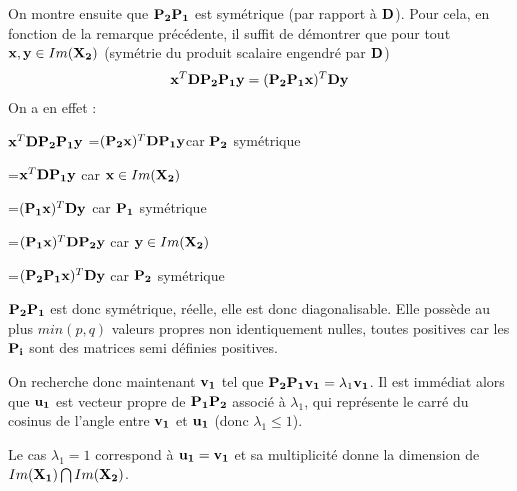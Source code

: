 \documentclass[letterpaper,10pt,french]{sphinxmanual}
\begin{document}
\sphinxAtStartPar
On montre ensuite que \({\bf P_2}{\bf P_1}\) est symétrique (par rapport à \({\bf D}\)). Pour cela, en fonction de la remarque précédente, il suffit de démontrer que pour tout \({\bf x},{\bf y}\in Im({\bf {\bf X_2}})\) (symétrie du produit scalaire engendré par \({\bf D}\))
\begin{equation*}
\begin{split}{\bf x}^T{\bf D}{\bf P_2}{\bf P_1}{\bf y} = ({\bf P_2}{\bf P_1}{\bf x})^T{\bf D}{\bf y}\end{split}
\end{equation*}
\sphinxAtStartPar
On a en effet :

\sphinxAtStartPar
\({\bf x}^T{\bf D}{\bf P_2}{\bf P_1}{\bf y}\) =\(({\bf P_2}{\bf x})^T{\bf D}{\bf P_1}{\bf y}\)car \({\bf P_2}\) symétrique

\sphinxAtStartPar
=\({\bf x}^T{\bf D}{\bf P_1}{\bf y}\) car \({\bf x}\in Im({\bf {\bf X_2}})\)

\sphinxAtStartPar
=\(({\bf P_1}{\bf x})^T{\bf D}{\bf y}\) car \({\bf P_1}\) symétrique

\sphinxAtStartPar
=\(({\bf P_1}{\bf x})^T{\bf D}{\bf P_2}{\bf y}\) car \({\bf y}\in Im({\bf {\bf X_2}})\)

\sphinxAtStartPar
=\(({\bf P_2}{\bf P_1}{\bf x})^T{\bf D}{\bf y}\) car \({\bf P_2}\) symétrique

\sphinxAtStartPar
\({\bf P_2}{\bf P_1}\) est donc symétrique, réelle, elle est donc diagonalisable. Elle possède au plus \(min(p,q)\) valeurs propres non identiquement nulles, toutes positives car les \({\bf {\bf P_i}}\) sont des matrices semi définies positives.

\sphinxAtStartPar
On recherche donc maintenant \({\bf v_1}\) tel que \({\bf P_2}{\bf P_1}{\bf v_1}=\lambda_1{\bf v_1}\). Il est immédiat alors que \({\bf {\bf u_1}}\) est vecteur propre de \({\bf P_1}{\bf P_2}\) associé à \(\lambda_1\), qui représente le carré du cosinus de l’angle entre \({\bf v_1}\) et \({\bf {\bf u_1}}\) (donc \(\lambda_1\leq 1\)).

\sphinxAtStartPar
Le cas \(\lambda_1=1\) correspond à \({\bf {\bf u_1}}={\bf v_1}\) et sa multiplicité donne la dimension de \(Im({\bf {\bf X_1}})\bigcap Im({\bf {\bf X_2}})\).
\end{document}
